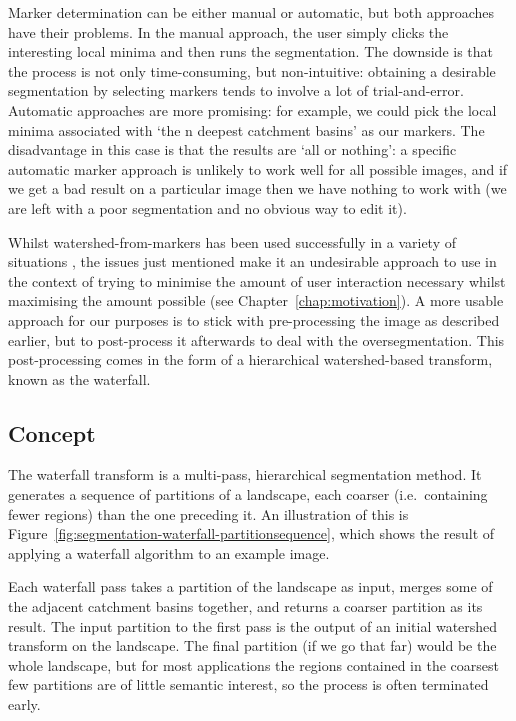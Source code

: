 Marker determination can be either manual or automatic, but both approaches have their problems. In the manual approach, the user simply clicks the interesting local minima and then runs the segmentation. The downside is that the process is not only time-consuming, but non-intuitive: obtaining a desirable segmentation by selecting markers tends to involve a lot of trial-and-error. Automatic approaches are more promising: for example, we could pick the local minima associated with `the n deepest catchment basins' as our markers. The disadvantage in this case is that the results are `all or nothing': a specific automatic marker approach is unlikely to work well for all possible images, and if we get a bad result on a particular image then we have nothing to work with (we are left with a poor segmentation and no obvious way to edit it).

Whilst watershed-from-markers has been used successfully in a variety of situations \cite{?}, the issues just mentioned make it an undesirable approach to use in the context of trying to minimise the amount of user interaction necessary whilst maximising the amount possible (see Chapter~\ref{chap:motivation}). A more usable approach for our purposes is to stick with pre-processing the image as described earlier, but to post-process it afterwards to deal with the oversegmentation. This post-processing comes in the form of a hierarchical watershed-based transform, known as the waterfall.

\subsection{Concept}

The waterfall transform is a multi-pass, hierarchical segmentation method. It generates a sequence of partitions of a landscape, each coarser (i.e.~containing fewer regions) than the one preceding it. An illustration of this is Figure~\ref{fig:segmentation-waterfall-partitionsequence}, which shows the result of applying a waterfall algorithm to an example image.


Each waterfall pass takes a partition of the landscape as input, merges some of the adjacent catchment basins together, and returns a coarser partition as its result. The input partition to the first pass is the output of an initial watershed transform on the landscape. The final partition (if we go that far) would be the whole landscape, but for most applications the regions contained in the coarsest few partitions are of little semantic interest, so the process is often terminated early.

